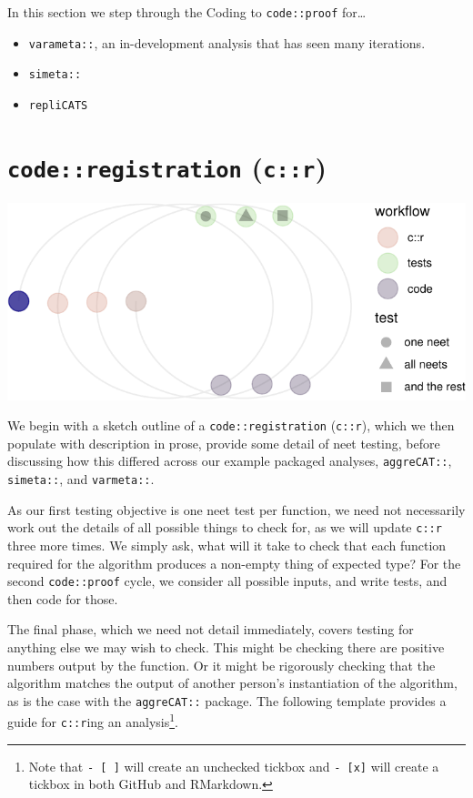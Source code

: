 \documentclass[
]{article}
\providecommand{\tightlist}{%
  \setlength{\itemsep}{0pt}\setlength{\parskip}{0pt}}
\begin{document}
In this section we step through the Coding to \texttt{code::proof} for\ldots{}

\begin{itemize}
\tightlist
\item
  \texttt{varameta::}, an in-development analysis that has seen many iterations.\\
\item
  \texttt{simeta::}
\item
  \texttt{repliCATS}
\end{itemize}

\hypertarget{coderegistration-cr}{%
\section{\texorpdfstring{\texttt{code::registration} (\texttt{c::r})}{code::registration (c::r)}}\label{coderegistration-cr}}

\begin{center}\includegraphics{when-is-done-done_files/figure-latex/unnamed-chunk-9-1} \end{center}

We begin with a sketch outline of a \texttt{code::registration} (\texttt{c::r}), which we then populate with description in prose, provide some detail of neet testing, before discussing how this differed across our example packaged analyses, \texttt{aggreCAT::}, \texttt{simeta::}, and \texttt{varmeta::}.

As our first testing objective is one neet test per function, we need not necessarily work out the details of all possible things to check for, as we will update \texttt{c::r} three more times. We simply ask, what will it take to check that each function required for the algorithm produces a non-empty thing of expected type? For the second \texttt{code::proof} cycle, we consider all possible inputs, and write tests, and then code for those.

The final phase, which we need not detail immediately, covers testing for anything else we may wish to check. This might be checking there are positive numbers output by the function. Or it might be rigorously checking that the algorithm matches the output of another person's instantiation of the algorithm, as is the case with the \texttt{aggreCAT::} package. The following template provides a guide for \texttt{c::r}ing an analysis\footnote{Note that \texttt{-\ {[}\ {]}} will create an unchecked tickbox and \texttt{-\ {[}x{]}} will create a tickbox in both GitHub and RMarkdown.}.
\end{document}
